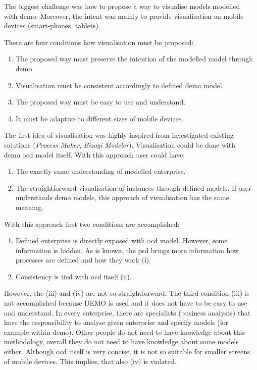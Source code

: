 The biggest challenge was how to propose a way to visualise models modelled with \gls{demo}. Moreover, the intent was mainly to provide visualisation on mobile devices (smart-phones, tablets).

There are four conditions how visualisation must be proposed:
\begin{enumerate}[i]
    \item The proposed way must preserve the intention of the modelled model through \gls{demo}
    \item Visualisation must be consistent accordingly to defined \gls{demo} model.
    \item The proposed way must be easy to use and understand.  
    \item It must be adaptive to different sizes of mobile devices. 
\end{enumerate}

The first idea of visualisation was highly inspired from investigated existing solutions (\textit{Process Maker}, \textit{Bizagi Modeler}). Visualisation could be done with \gls{demo} \gls{ocd} model itself. With this approach user could have:
\begin{enumerate}
  \item The exactly same understanding of modelled enterprise.
  \item The straightforward visualisation of instances through defined models. If user understands \gls{demo} models, this approach of visualisation has the same meaning.
\end{enumerate}

With this approach first two conditions are accomplished:
\begin{enumerate}
\item Defined enterprise is directly exposed with \gls{ocd} model. However, some information is hidden. As is known, the \gls{psd} brings more information how processes are defined and how they work (i). 
\item Consistency is tied with \gls{ocd} itself (ii).
\end{enumerate}

However, the (iii) and (iv) are not so straightforward. The third condition (iii) is not accomplished because DEMO is used and it does not have to be easy to use and understand. In every enterprise, there are specialists (business analysts) that have the responsibility to analyse given enterprise and specify models (for example within \gls{demo}). Other people do not need to have knowledge about this methodology, overall they do not need to have knowledge about some models either. Although \gls{ocd} itself is very concise, it is not so suitable for smaller screens of mobile devices. This implies, that also (iv) is violated.
